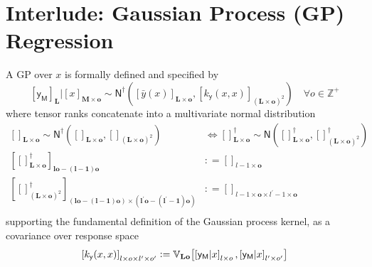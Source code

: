 \documentclass[preprint,12pt]{elsarticle}
\newcommand*{\M}[1]{\ensuremath{#1}\xspace}
\newcommand*{\x}{\times}
\newcommand*{\mi}[1]{\mathbf{#1}}
\newcommand*{\st}[1]{\mathbb{#1}}
\newcommand*{\rv}[1]{\mathsf{#1}}
\newcommand*{\te}[2][]{\left\lbrack{#2}\right\rbrack_{#1}}
\newcommand*{\deq}{\M{\mathrel{\mathop:}=}}
\newcommand*{\cov}[3][]{\ifthenelse{\equal{#1}{}}{\mathbb{V}_{#3}\!\left\lbrack{#2}\right\rbrack}{\mathbb{V}_{#3}\!\left\lbrack{#2,#1}\right\rbrack}}
\newcommand*{\gauss}[2]{\mathsf{N}\!\left({#1,#2}\right)}
\newcommand*{\gaussd}[2]{\mathsf{N}^{\dagger}\!\left({#1,#2}\right)}
\begin{document}
\section{Interlude: Gaussian Process (GP) Regression} \label{sec:GPR}
    A GP over $x$ is formally defined and specified by
    \begin{equation*}
        \te[\mi{L}]{\rv{y_M}} \big\vert \te[\mi{M}\x\mi{o}]{x} \sim 
        \gaussd{\te[\mi{L}\x\mi{o}]{\bar{y}(x)}}{\te[(\mi{L}\x\mi{o})^{2}]
        {k_{\rv{y}}(x,x)}} \quad \forall o \in \st{Z^{+}}
    \end{equation*}
    where tensor ranks concatenate into a multivariate normal distribution
    \begin{equation*}
        \begin{aligned}
            \te[\mi{L}\x\mi{o}]{} \sim \gaussd{\te[\mi{L}\x\mi{o}]{}}{\te[(\mi{L\x o})^{2}]{}}
            & \Longleftrightarrow
            \te[\mi{L}\x\mi{o}]{}^{\dagger} \sim \gauss{\te[\mi{L}\x\mi{o}]{}^{\dagger}}{\te[(\mi{L\x o})^{2}]{}^{\dagger}} \\
            \te[\mi{lo}-\mi{(l-1)o}]{\te[\mi{L}\x\mi{o}]{}^{\dagger}} 
            &\deq \te[l-1\x\mi{o}]{} \\
            \te[(\mi{lo}-(\mi{l-1})\mi{o}) \x (\mi{l^{\prime}o}-\mi{(l^{\prime}-1)o})]
            {\te[(\mi{L\x o})^{2}]{}^{\dagger}} 
            &\deq \te[l-1\x\mi{o} \x l^{\prime}-1\x\mi{o}]{} \\
        \end{aligned}
    \end{equation*}
    supporting the fundamental definition of the Gaussian process kernel, as a covariance over response space
    \begin{equation*}
        \te[l\x o\x l^{\prime}\x o^{\prime}]{k_{\rv{y}}(x,x)} 
        \deq \cov[{\te[l^{\prime}\x o^{\prime}]{\rv{y_M}\vert x}}]{\te[l\x o]{\rv{y_M}\vert x}}{\mi{Lo}}
    \end{equation*}
\end{document}

